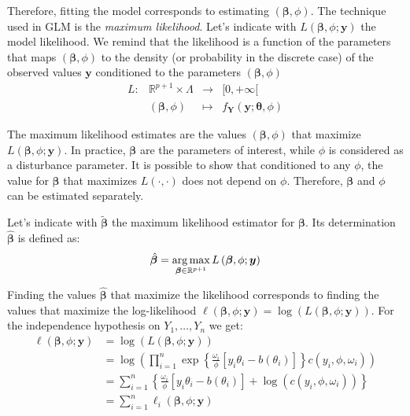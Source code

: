 \documentclass[a4paper, nobind]{templates/ociamthesis}
\theoremstyle{definition}
\theoremstyle{definition}
\theoremstyle{definition}
\theoremstyle{remark}
\begin{document}
Therefore, fitting the model corresponds to estimating \(\left(\boldsymbol{\beta}, \phi\right)\). The technique used in GLM is the \emph{maximum likelihood}. Let's indicate with \(L\left(\boldsymbol{\beta}, \phi; \boldsymbol{y}\right)\) the model likelihood. We remind that the likelihood is a function of the parameters that maps \(\left(\boldsymbol{\beta}, \phi\right)\) to the density (or probability in the discrete case) of the observed values \(\boldsymbol{y}\) conditioned to the parameters \(\left(\boldsymbol{\beta}, \phi\right)\)
\[
\begin{array}{cccc}
L: & \mathbb{R}^{p+1} \times \Lambda & \longrightarrow & [0, +\infty[ \\
   & \left(\boldsymbol{\beta}, \phi\right) & \longmapsto & f_{\boldsymbol{Y}}(\boldsymbol{y}; \boldsymbol{\theta}, \phi)
\end{array}
\]

The maximum likelihood estimates are the values \(\left(\boldsymbol{\beta}, \phi\right)\) that maximize \(L\left(\boldsymbol{\beta}, \phi; \boldsymbol{y}\right)\). In practice, \(\boldsymbol{\beta}\) are the parameters of interest, while \(\phi\) is considered as a disturbance parameter. It is possible to show that conditioned to any \(\phi\), the value for \(\boldsymbol{\beta}\) that maximizes \(L(\cdot, \cdot)\) does not depend on \(\phi\). Therefore, \(\boldsymbol{\beta}\) and \(\phi\) can be estimated separately.

Let's indicate with \(\tilde{\boldsymbol{\beta}}\) the maximum likelihood estimator for \(\boldsymbol{\beta}\). Its determination \(\hat{\boldsymbol{\beta}}\) is defined as:
\begin{equation}
\label{eq:max-lik-est}
\hat{\boldsymbol{\beta}} = \operatorname*{arg\,max}_{\boldsymbol{\beta}\in\mathbb{R}^{p+1}}{L\left(\boldsymbol{\beta}, \phi; \boldsymbol{y}\right)}
\end{equation}

Finding the values \(\hat{\boldsymbol{\beta}}\) that maximize the likelihood corresponds to finding the values that maximize the log-likelihood \(\ell\left(\boldsymbol{\beta}, \phi; \boldsymbol{y}\right) = \log{\left(L\left(\boldsymbol{\beta}, \phi; \boldsymbol{y}\right)\right)}\). For the independence hypothesis on \(Y_1, \dots, Y_n\) we get:
\begin{align}
\nonumber
\ell\left(\boldsymbol{\beta}, \phi; \boldsymbol{y}\right) & =
\log{\left(L\left(\boldsymbol{\beta}, \phi; \boldsymbol{y}\right)\right)}
\\ \nonumber & =
\log{\left(\prod_{i=1}^{n}{\exp{\left\{ \frac{\omega_i}{\phi} \left[y_i\theta_i - b(\theta_i) \right] \right\}} c(y_i, \phi, \omega_i)}\right)}
\\ \label{eq:log-like} & =
\sum_{i=1}^{n}{
\left\{
\frac{\omega_i}{\phi} \left[y_i\theta_i - b(\theta_i) \right] + \log{\left(c(y_i, \phi, \omega_i)\right)}
\right\}
}
\\ \nonumber & =
\sum_{i=1}^{n}{\ell_i\left(\boldsymbol{\beta}, \phi; \boldsymbol{y}\right)}
\end{align}
\end{document}
